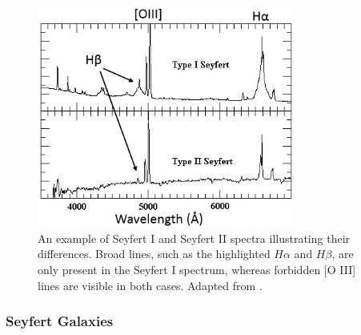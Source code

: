 \begin{figure}[!ht]
	\centering
	\includegraphics[width=0.75\textwidth]{pictures/Chapter2/Syefert1vsSeyfer2}
	\caption{An example of Seyfert I and Seyfert II spectra illustrating their differences. Broad lines, such as the highlighted $H\alpha$ and $H\beta$, are only present in the Seyfert I spectrum, whereas forbidden [O III] lines are visible in both cases. Adapted from \parencite{researchgate_seyfert2025}.}
	
	\label{fig:Seyfert1vsSeyfert2}
\end{figure}



\subsubsection{Seyfert Galaxies}

